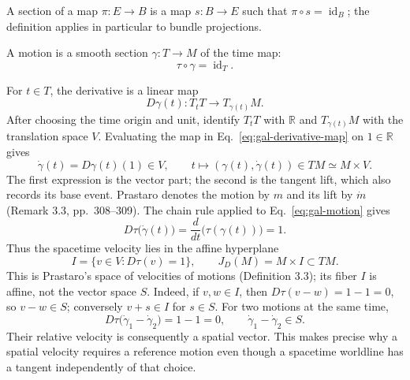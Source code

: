 A section of a map $\pi:E\to B$ is a map $s:B\to E$ such that
$\pi\circ s=\operatorname{id}_B$; the definition applies in particular to
bundle projections.
\begin{definition}[Motion]
A motion is a smooth section $\gamma:T\to M$ of the time map:
\begin{equation}\label{eq:gal-motion}
 \tau\circ\gamma=\operatorname{id}_T.
\end{equation}
\end{definition}
For $t\in T$, the derivative is a linear map
\begin{equation}\label{eq:gal-derivative-map}
 D\gamma(t):T_tT\longrightarrow T_{\gamma(t)}M.
\end{equation}
After choosing the time origin and unit, identify $T_tT$ with $\mathbb R$
and $T_{\gamma(t)}M$ with the translation space $V$.  Evaluating the map
in Eq.~\eqref{eq:gal-derivative-map} on $1\in\mathbb R$ gives
\begin{equation}\label{eq:gal-tangent-lift}
 \dot\gamma(t)=D\gamma(t)(1)\in V,\qquad
 t\longmapsto(\gamma(t),\dot\gamma(t))\in TM\simeq M\times V.
\end{equation}
The first expression is the vector part; the second is the tangent lift,
which also records its base event.  Prastaro denotes the motion by $m$
and its lift by $\dot m$ (Remark 3.3, pp.~308--309).
The chain rule applied to Eq.~\eqref{eq:gal-motion} gives
\begin{equation}\label{eq:gal-velocity-normalization}
 D\tau\bigl(\dot\gamma(t)\bigr)
 =\frac{d}{dt}\bigl(\tau(\gamma(t))\bigr)=1.
\end{equation}
Thus the spacetime velocity lies in the affine hyperplane
\begin{equation}\label{eq:gal-velocity-bundle}
 I=\{v\in V:D\tau(v)=1\},\qquad
 J_D(M)=M\times I\subset TM.
\end{equation}
This is Prastaro's space of velocities of motions (Definition 3.3); its
fiber $I$ is affine, not the vector space $S$.  Indeed, if $v,w\in I$,
then $D\tau(v-w)=1-1=0$, so $v-w\in S$; conversely $v+s\in I$ for
$s\in S$.  For two motions at the same time,
\begin{equation}\label{eq:gal-relative-velocity}
 D\tau\bigl(\dot\gamma_1-\dot\gamma_2\bigr)=1-1=0,
 \qquad \dot\gamma_1-\dot\gamma_2\in S.
\end{equation}
Their relative velocity is consequently a spatial vector.  This makes precise
why a spatial velocity requires a reference motion even though a spacetime
worldline has a tangent independently of that choice.

